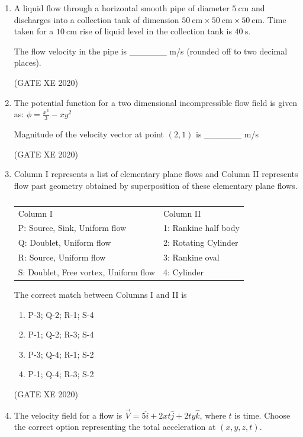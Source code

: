 \documentclass[12pt]{article}
\begin{document}
\begin{enumerate}
\item A liquid flow through a horizontal smooth pipe of diameter $5 \ \text{cm}$ and discharges into a collection tank of dimension $50 \ \text{cm} \times 50 \ \text{cm} \times 50 \ \text{cm}$. Time taken for a $10 \ \text{cm}$ rise of liquid level in the collection tank is $40 \ \text{s}$.  

The flow velocity in the pipe is \_\_\_\_\_\_ m/s (rounded off to two decimal places).

(GATE XE 2020)

\item The potential function for a two dimensional incompressible flow field is given as:  
$
\phi = \frac{x^3}{3} - x y^2
$

Magnitude of the velocity vector at point $(2,1)$ is \_\_\_\_\_\_ m/s  

(GATE XE 2020)

\item Column I represents a list of elementary plane flows and Column II represents flow past geometry obtained by superposition of these elementary plane flows.

\begin{table}[H]
\centering
\begin{tabular}{l l}

Column I &  Column II  \\

P: Source, Sink, Uniform flow  & 1: Rankine half body  \\
Q: Doublet, Uniform flow & 2: Rotating Cylinder  \\
R: Source, Uniform flow & 3: Rankine oval  \\
S: Doublet, Free vortex, Uniform flow  & 4: Cylinder  \\
\end{tabular}
\caption{}
\label{}
\end{table}

The correct match between Columns I and II is

\begin{enumerate}
\item P-3; Q-2; R-1; S-4
\item P-1; Q-2; R-3; S-4
\item P-3; Q-4; R-1; S-2
\item P-1; Q-4; R-3; S-2
\end{enumerate}
(GATE XE 2020)

\item The velocity field for a flow is $\vec{V} = 5\hat{i} + 2xt\hat{j} + 2ty\hat{k}$, where $t$ is time. Choose the correct option representing the total acceleration at $(x,y,z,t)$.


\end{enumerate}
\end{document}
